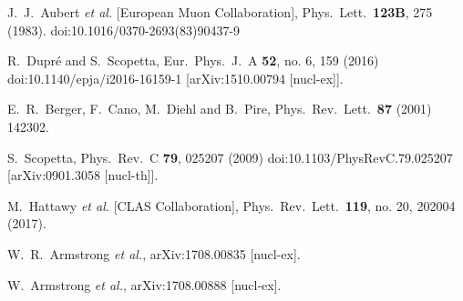 \documentclass[twocolumn]{revtex4}
\begin{document}
\begin{thebibliography}{25}
  J.~J.~Aubert {\it et al.} [European Muon Collaboration],
  Phys.\ Lett.\  {\bf 123B}, 275 (1983).
  doi:10.1016/0370-2693(83)90437-9

  R.~Dupr\'e and S.~Scopetta,
  Eur.\ Phys.\ J.\ A {\bf 52}, no. 6, 159 (2016)
  doi:10.1140/epja/i2016-16159-1
  [arXiv:1510.00794 [nucl-ex]].

  E.~R.~Berger, F.~Cano, M.~Diehl and B.~Pire,
  Phys.\ Rev.\ Lett.\  {\bf 87} (2001) 142302.

  S.~Scopetta,
  Phys.\ Rev.\ C {\bf 79}, 025207 (2009)
  doi:10.1103/PhysRevC.79.025207
  [arXiv:0901.3058 [nucl-th]].

  M.~Hattawy {\it et al.} [CLAS Collaboration],
  Phys.\ Rev.\ Lett.\  {\bf 119}, no. 20, 202004 (2017).


  W.~R.~Armstrong {\it et al.},
  arXiv:1708.00835 [nucl-ex].


  W.~Armstrong {\it et al.},
  arXiv:1708.00888 [nucl-ex].


\end{thebibliography}
\end{document}
